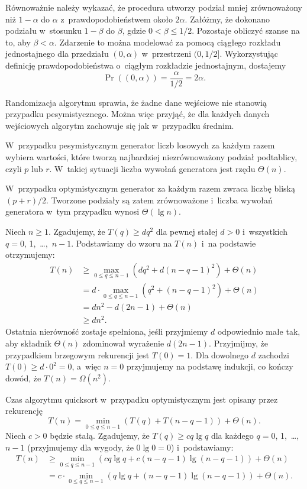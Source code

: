 \exercise %
Równoważnie należy wykazać, że procedura  utworzy podział mniej zrównoważony niż $1-\alpha$ do $\alpha$ z~prawdopodobieństwem około $2\alpha$. Załóżmy, że dokonano podziału w~stosunku $1-\beta$ do $\beta$, gdzie $0<\beta\le1/2$. Pozostaje obliczyć szanse na to, aby $\beta<\alpha$. Zdarzenie to można modelować za pomocą ciągłego rozkładu jednostajnego dla przedziału $(0,\alpha)$ w~przestrzeni $(0,1/2]$. Wykorzystując definicję prawdopodobieństwa o~ciągłym rozkładzie jednostajnym, dostajemy
\[
	\Pr((0,\alpha)) = \frac{\alpha}{1/2} = 2\alpha.
\]


\exercise %
Randomizacja algorytmu sprawia, że żadne dane wejściowe nie stanowią przypadku pesymistycznego. Można więc przyjąć, że dla każdych danych wejściowych algorytm zachowuje się jak w~przypadku średnim.

\exercise %
W~przypadku pesymistycznym generator liczb losowych za każdym razem wybiera wartości, które tworzą najbardziej niezrównoważony podział podtablicy, czyli $p$ lub $r$. W~takiej sytuacji liczba wywołań generatora jest rzędu $\Theta(n)$.

W~przypadku optymistycznym generator za każdym razem zwraca liczbę bliską $(p+r)/2$. Tworzone podziały są zatem zrównoważone i~liczba wywołań generatora w~tym przypadku wynosi $\Theta(\lg n)$.


\exercise %
Niech $n\ge1$. Zgadujemy, że $T(q)\ge dq^2$ dla pewnej stałej $d>0$ i~wszystkich $q=0$, 1,~\dots,~$n-1$. Podstawiamy do wzoru na $T(n)$ i~na podstawie  otrzymujemy:
\begin{align*}
	T(n) &\ge \max_{0\le q\le n-1}(dq^2+d(n-q-1)^2)+\Theta(n) \\
	&= d\cdot\!\!\!\max_{0\le q\le n-1}(q^2+(n-q-1)^2)+\Theta(n) \\
	&= dn^2-d(2n-1)+\Theta(n) \\
	&\ge dn^2.
\end{align*}
Ostatnia nierówność zostaje spełniona, jeśli przyjmiemy $d$ odpowiednio małe tak, aby składnik $\Theta(n)$ zdominował wyrażenie $d(2n-1)$. Przyjmijmy, że przypadkiem brzegowym rekurencji jest $T(0)=1$. Dla dowolnego $d$ zachodzi $T(0)\ge d\cdot0^2=0$, a~więc $n=0$ przyjmujemy na podstawę indukcji, co kończy dowód, że $T(n)=\Omega(n^2)$.

\exercise %
Czas algorytmu quicksort w~przypadku optymistycznym jest opisany przez rekurencję
\[
    T(n) = \min_{0\le q\le n-1}(T(q)+T(n-q-1))+\Theta(n).
\]
Niech $c>0$ będzie stałą. Zgadujemy, że $T(q)\ge cq\lg q$ dla każdego $q=0$, 1,~\dots,~$n-1$ (przyjmujemy dla wygody, że $0\lg0=0$) i~podstawiamy:
\begin{align*}
    T(n) &\ge \min_{0\le q\le n-1}(cq\lg q+c(n-q-1)\lg(n-q-1))+\Theta(n) \\
	&= c\cdot\!\!\!\min_{0\le q\le n-1}(q\lg q+(n-q-1)\lg(n-q-1))+\Theta(n).
\end{align*}


